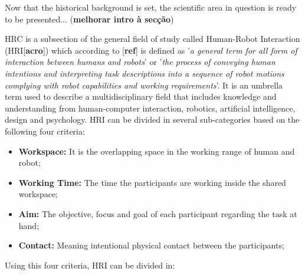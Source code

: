 \par Now that the historical background is set, the scientific area in question is ready to be presented... (\textbf{melhorar intro à secção})

\par HRC is a subsection of the general field of study called Human-Robot Interaction (HRI[\textbf{acro}]) which according to [\textbf{ref}] is defined as '\textit{a general term for all form of interaction between humans and robots}' or '\textit{the process of conveying human intentions and interpreting task descriptions into a sequence of robot motions complying with robot capabilities and working requirements}'. It is an umbrella term used to describe a multidisciplinary field that includes knowledge and understanding from human-computer interaction, robotics, artificial intelligence, design and psychology. 
HRI can be divided in several sub-categories based on the following four criteria:

\begin{itemize}
    \item \textbf{Workspace: }It is the overlapping space in the working range of human and robot;
    \item \textbf{Working Time: }The time the participants are working inside the shared workspace;
    \item \textbf{Aim: }The objective, focus and goal of each participant regarding the task at hand;
    \item \textbf{Contact: }Meaning intentional physical contact between the participants;
\end{itemize}

\noindent Using this four criteria, HRI can be divided in:

